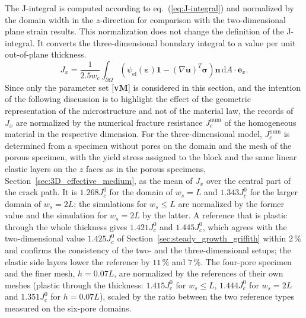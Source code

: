 \documentclass[pdflatex,sn-mathphys-num]{sn-jnl}%
\newcommand{\vMLabel}{[\textbf{vM}]\xspace}
\theoremstyle{thmstyleone}%
\theoremstyle{thmstyletwo}%
\theoremstyle{thmstylethree}%
\begin{document}
The J-integral is computed according to eq.~(\ref{eq:J-integral}) and normalized by the domain width in the $z$-direction for comparison with the two-dimensional plane strain results. This normalization does not change the definition of the J-integral. It converts the three-dimensional boundary integral to a value per unit out-of-plane thickness.
\begin{equation}
    J_x = \dfrac{1}{2.5 w_c}\int_{\partial\Omega}\left(\psi_{\text{el}}(\boldsymbol{\varepsilon})\boldsymbol{1} - (\nabla\boldsymbol{u})^T\boldsymbol{\sigma}\right)\boldsymbol{n}\,\mathrm{d}A\cdot\boldsymbol{e}_x.
    \label{eq:J_3D}
\end{equation}
Since only the parameter set \vMLabel is considered in this section, and the intention of the following discussion is to highlight the effect of the geometric representation of the microstructure and not of the material law, the records of $J_x$ are normalized by the numerical fracture resistance $J_c^{\text{num}}$ of the homogeneous material in the respective dimension. For the three-dimensional model, $J_c^{\text{num}}$ is determined from a specimen without pores on the domain and the mesh of the porous specimen, with the yield stress assigned to the block and the same linear elastic layers on the $z$ faces as in the porous specimens, Section~\ref{sec:3D_effective_medium}, as the mean of $J_x$ over the central part of the crack path. It is $1.268J_c^0$ for the domain of $w_s = L$ and $1.343J_c^0$ for the larger domain of $w_s = 2L$; the simulations for $w_s \le L$ are normalized by the former value and the simulation for $w_s = 2L$ by the latter. A reference that is plastic through the whole thickness gives $1.421J_c^0$ and $1.445J_c^0$, which agrees with the two-dimensional value $1.425J_c^0$ of Section~\ref{sec:steady_growth_griffith} within $2\,\%$ and confirms the consistency of the two- and the three-dimensional setups; the elastic side layers lower the reference by $11\,\%$ and $7\,\%$. The four-pore specimen and the finer mesh, $h = 0.07L$, are normalized by the references of their own meshes (plastic through the thickness: $1.415J_c^0$ for $w_s \le L$, $1.444J_c^0$ for $w_s = 2L$ and $1.351J_c^0$ for $h = 0.07L$), scaled by the ratio between the two reference types measured on the six-pore domains.
\end{document}
